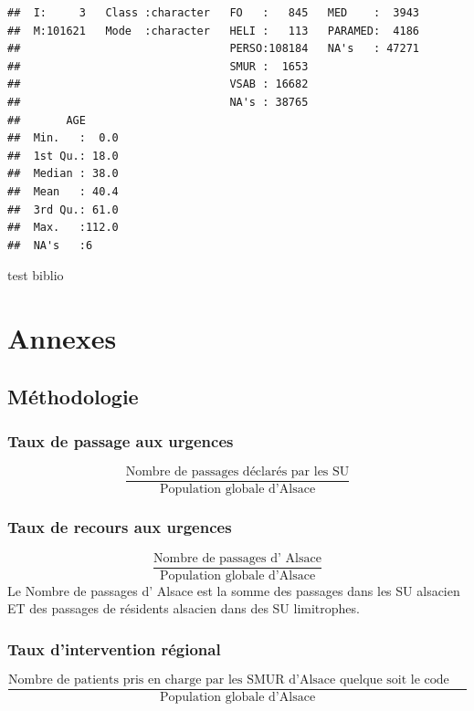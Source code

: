 \documentclass[12pt,english,french,twoside]{report}\usepackage[]{graphicx}\usepackage[]{color}
\makeatletter
\newenvironment{kframe}{%
 \def\at@end@of@kframe{}%
 \ifinner\ifhmode%
  \def\at@end@of@kframe{\end{minipage}}%
  \begin{minipage}{\columnwidth}%
 \fi\fi%
 \def\FrameCommand##1{\hskip\@totalleftmargin \hskip-\fboxsep
 \colorbox{shadecolor}{##1}\hskip-\fboxsep
     \hskip-\linewidth \hskip-\@totalleftmargin \hskip\columnwidth}%
 \MakeFramed {\advance\hsize-\width
   \@totalleftmargin\z@ \linewidth\hsize
   \@setminipage}}%
 {\par\unskip\endMakeFramed%
 \at@end@of@kframe}
\newenvironment{knitrout}{}{} %
\makeatother
\begin{document}
\begin{knitrout}
\begin{kframe}
\begin{verbatim}
##  I:     3   Class :character   FO   :   845   MED    :  3943  
##  M:101621   Mode  :character   HELI :   113   PARAMED:  4186  
##                                PERSO:108184   NA's   : 47271  
##                                SMUR :  1653                   
##                                VSAB : 16682                   
##                                NA's : 38765                   
##       AGE       
##  Min.   :  0.0  
##  1st Qu.: 18.0  
##  Median : 38.0  
##  Mean   : 40.4  
##  3rd Qu.: 61.0  
##  Max.   :112.0  
##  NA's   :6
\end{verbatim}
\end{kframe}
\end{knitrout}


test biblio \cite{1}
\part{Annexes}
\appendix
\chapter{Méthodologie}


\section*{Taux de passage aux urgences}
  \begin{displaymath}
    \frac{\text{Nombre de passages déclarés par les SU}}{\text{Population globale d'Alsace}}
  \end{displaymath}

\section*{Taux de recours aux urgences}
\begin{displaymath}
    \frac{\text{Nombre de passages d' Alsace}}{\text{Population globale d'Alsace}}
  \end{displaymath}
Le Nombre de passages d' Alsace est la somme des passages dans les SU alsacien ET des passages de résidents alsacien dans des SU limitrophes.

\section*{Taux d'intervention régional}
\begin{displaymath}
    \frac{\text{Nombre de patients pris en charge par les SMUR d'Alsace quelque soit le code postal du lieu d'intervention}}{\text{Population globale d'Alsace}}
  \end{displaymath}
\end{document}
